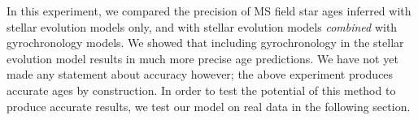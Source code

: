 In this experiment, we compared the precision of MS field star ages inferred
with stellar evolution models only, and with stellar evolution models {\it
combined} with gyrochronology models.
We showed that including gyrochronology in the stellar evolution model results
in much more precise age predictions.
We have not yet made any statement about accuracy however; the above
experiment produces accurate ages by construction.
In order to test the potential of this method to produce accurate results, we
test our model on real data in the following section.


